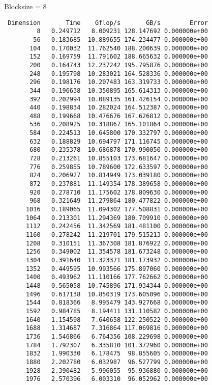 \documentclass{article}
\begin{document}
\begin{enumerate}
    Blocksize = 8
    \begin{verbatim}
 Dimension       Time    Gflop/s       GB/s        Error
         8   0.249712   8.009231 128.147692 0.000000e+00
        56   0.183685  10.889655 174.234477 0.000000e+00
       104   0.170032  11.762540 188.200639 0.000000e+00
       152   0.169759  11.791602 188.665632 0.000000e+00
       200   0.164743  12.237242 195.795876 0.000000e+00
       248   0.195798  10.283021 164.528336 0.000000e+00
       296   0.198176  10.207483 163.319733 0.000000e+00
       344   0.196638  10.350895 165.614313 0.000000e+00
       392   0.202994  10.089135 161.426154 0.000000e+00
       440   0.198834  10.282024 164.512387 0.000000e+00
       488   0.199668  10.476676 167.626812 0.000000e+00
       536   0.208925  10.318867 165.101864 0.000000e+00
       584   0.224513  10.645800 170.332797 0.000000e+00
       632   0.188829  10.694797 171.116745 0.000000e+00
       680   0.235378  10.686878 170.990050 0.000000e+00
       728   0.213261  10.855103 173.681647 0.000000e+00
       776   0.259855  10.789600 172.633597 0.000000e+00
       824   0.206927  10.814949 173.039180 0.000000e+00
       872   0.237881  11.149354 178.389658 0.000000e+00
       920   0.278710  11.175602 178.809630 0.000000e+00
       968   0.321649  11.279864 180.477822 0.000000e+00
      1016   0.189065  11.094302 177.508831 0.000000e+00
      1064   0.213301  11.294369 180.709910 0.000000e+00
      1112   0.242456  11.342569 181.481100 0.000000e+00
      1160   0.278242  11.219701 179.515213 0.000000e+00
      1208   0.310151  11.367308 181.876922 0.000000e+00
      1256   0.349002  11.354578 181.673248 0.000000e+00
      1304   0.391640  11.323371 181.173932 0.000000e+00
      1352   0.449595  10.993566 175.897060 0.000000e+00
      1400   0.493962  11.110166 177.762662 0.000000e+00
      1448   0.565058  10.745896 171.934344 0.000000e+00
      1496   0.617138  10.850319 173.605096 0.000000e+00
      1544   0.818366   8.995479 143.927668 0.000000e+00
      1592   0.984785   8.194411 131.110582 0.000000e+00
      1640   1.154598   7.640658 122.250522 0.000000e+00
      1688   1.314687   7.316864 117.069816 0.000000e+00
      1736   1.546866   6.764356 108.229698 0.000000e+00
      1784   1.792307   6.335810 101.372960 0.000000e+00
      1832   1.990330   6.178475  98.855605 0.000000e+00
      1880   2.202780   6.032987  96.527799 0.000000e+00
      1928   2.390482   5.996055  95.936880 0.000000e+00
      1976   2.570396   6.003310  96.052962 0.000000e+00
    \end{verbatim}


\end{enumerate}
\end{document}
